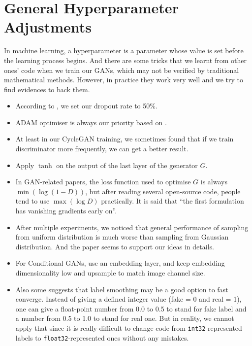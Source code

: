 \section{General Hyperparameter Adjustments}
In machine learning, a hyperparameter is a parameter whose value is set before the learning process begins. And there are some tricks that we learnt from other ones' code when we train our GANs, which may not be verified by traditional mathematical methods. However, in practice they work very well and we try to find evidences to back them.
\begin{itemize}
	\item According to \cite{Srivastava:2014:DSW:2627435.2670313}, we set our dropout rate to 50\%.
	\item ADAM optimiser is always our priority based on \cite{DBLP:journals/corr/SalimansGZCRC16}.
	\item At least in our CycleGAN training, we sometimes found that if we train discriminator more frequently, we can get a better result.
	\item Apply $ \tanh $ on the output of the last layer of the generator $ G $.
	\item In GAN-related papers, the loss function used to optimise $ G $ is always $ \min(\log{(1-D)}) $, but after reading several open-source code, people tend to use $ \max(\log{D}) $ practically. It is said that ``the first formulation has vanishing gradients early on''\cite{goodfellow2014generative}.
	\item After multiple experiments, we noticed that general performance of sampling from uniform distribution is much worse than sampling from Gaussian distribution. And the paper\cite{DBLP:journals/corr/White16a} seems to support our ideas in details.
	\item For Conditional GANs, use an embedding layer, and keep embedding dimensionality low and upsample to match image channel size.
	\item Also some suggests that label smoothing may be a good option to fast converge. Instead of giving a defined integer value (fake = 0 and real = 1), one can give a float-point number from 0.0 to 0.5 to stand for fake label and a number from 0.5 to 1.0 to stand for real one.  But in reality, we cannot apply that since it is really difficult to change code from \texttt{int32}-represented labels to \texttt{float32}-represented ones without any mistakes.
\end{itemize}